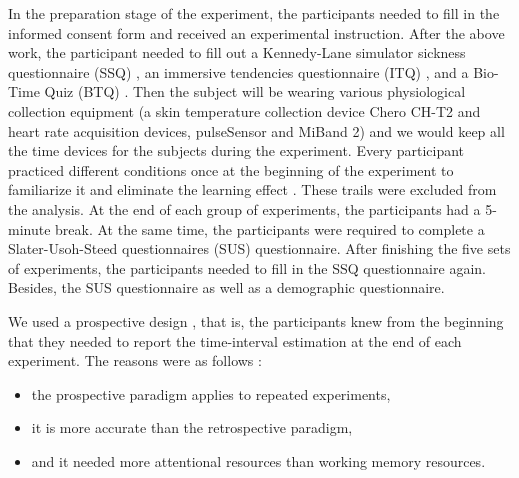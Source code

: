 \documentclass[sigconf]{acmart}
\begin{document}
In the preparation stage of the experiment, the participants needed to fill in the informed consent form and received an experimental instruction. After the above work, the participant needed to fill out a Kennedy-Lane simulator sickness questionnaire (SSQ) \cite{kennedy1993simulator}, an immersive tendencies questionnaire (ITQ) \cite{witmer1998measuring}, and a Bio-Time Quiz (BTQ) \cite{Breus:2016}. Then the subject will be wearing various physiological collection equipment (a skin temperature collection device Chero CH-T2 and heart rate acquisition devices, pulseSensor and MiBand 2) and we would keep all the time devices for the subjects during the experiment. Every participant practiced different conditions once at the beginning of the experiment to familiarize it and eliminate the learning effect \cite{莫文2008心理学实验中的各种效应及解决办法}. These trails were excluded from the analysis. At the end of each group of experiments, the participants had a 5-minute break. At the same time, the participants were required to complete a Slater-Usoh-Steed questionnaires (SUS) \cite{Catena00usingpresence} questionnaire. After finishing the five sets of experiments, the participants needed to fill in the SSQ questionnaire again. Besides, the SUS questionnaire as well as a demographic questionnaire.


We used a prospective design \cite{buhusi2005makes,gibbon1997toward}, that is, the participants knew from the beginning that they needed to report the time-interval estimation at the end of each experiment. The reasons were as follows \cite{block1997prospective}: 

\begin{itemize}
\item the prospective paradigm applies to repeated experiments, 
\item it is more accurate than the retrospective paradigm, 
\item and it needed more attentional resources than working memory resources. 
\end{itemize}
\end{document}
